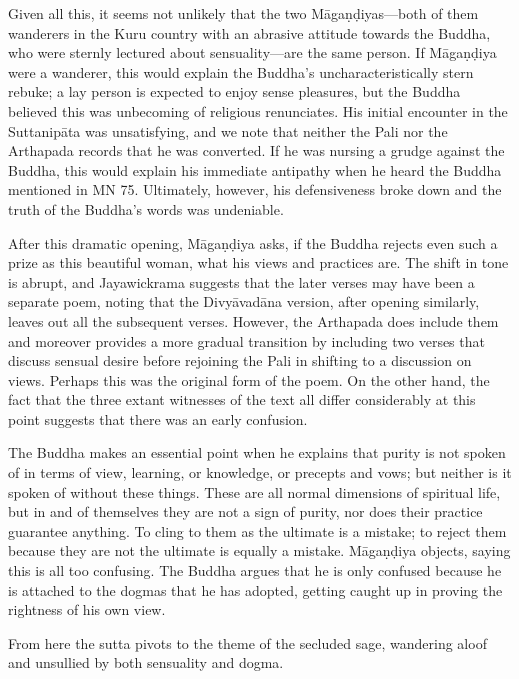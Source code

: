 \documentclass[12pt,openany]{book}%
\begin{document}
Given all this, it seems not unlikely that the two \textsanskrit{Māgaṇḍiyas}—both of them wanderers in the Kuru country with an abrasive attitude towards the Buddha, who were sternly lectured about sensuality—are the same person. If \textsanskrit{Māgaṇḍiya} were a wanderer, this would explain the Buddha’s uncharacteristically stern rebuke; a lay person is expected to enjoy sense pleasures, but the Buddha believed this was unbecoming of religious renunciates. His initial encounter in the \textsanskrit{Suttanipāta} was unsatisfying, and we note that neither the Pali nor the Arthapada records that he was converted. If he was nursing a grudge against the Buddha, this would explain his immediate antipathy when he heard the Buddha mentioned in MN 75. Ultimately, however, his defensiveness broke down and the truth of the Buddha’s words was undeniable.

After this dramatic opening, \textsanskrit{Māgaṇḍiya} asks, if the Buddha rejects even such a prize as this beautiful woman, what his views and practices are. The shift in tone is abrupt, and Jayawickrama suggests that the later verses may have been a separate poem, noting that the \textsanskrit{Divyāvadāna} version, after opening similarly, leaves out all the subsequent verses. However, the Arthapada does include them and moreover provides a more gradual transition by including two verses that discuss sensual desire before rejoining the Pali in shifting to a discussion on views. Perhaps this was the original form of the poem. On the other hand, the fact that the three extant witnesses of the text all differ considerably at this point suggests that there was an early confusion.

The Buddha makes an essential point when he explains that purity is not spoken of in terms of view, learning, or knowledge, or precepts and vows; but neither is it spoken of without these things. These are all normal dimensions of spiritual life, but in and of themselves they are not a sign of purity, nor does their practice guarantee anything. To cling to them as the ultimate is a mistake; to reject them because they are not the ultimate is equally a mistake. \textsanskrit{Māgaṇḍiya} objects, saying this is all too confusing. The Buddha argues that he is only confused because he is attached to the dogmas that he has adopted, getting caught up in proving the rightness of his own view.

From here the sutta pivots to the theme of the secluded sage, wandering aloof and unsullied by both sensuality and dogma.
\end{document}
